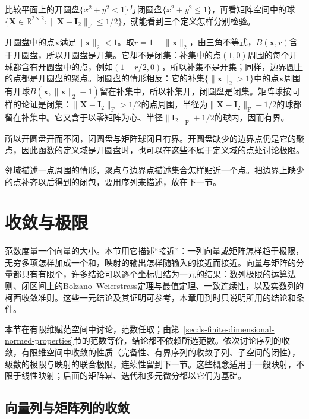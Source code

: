 \begin{example}[圆盘与矩阵球]
\label{ex:multivariable-open-closed-sets}
比较平面上的开圆盘$\{x^2+y^2<1\}$与闭圆盘$\{x^2+y^2\leq1\}$，再看矩阵空间中的球$\{\bm X\in\mathbb R^{2\times2}:\lVert\bm X-\bm I_2\rVert_{\mathrm F}\leq1/2\}$，就能看到三个定义怎样分别检验。

开圆盘中的点$\bm x$满足$\lVert\bm x\rVert_2<1$。取$r=1-\lVert\bm x\rVert_2$，由三角不等式，$B(\bm x,r)$含于开圆盘，所以开圆盘是开集。它却不是闭集：补集中的点$(1,0)$周围的每个开球都含有开圆盘中的点，例如$(1-r/2,0)$，所以补集不是开集；同样，边界圆上的点都是开圆盘的聚点。闭圆盘的情形相反：它的补集$\{\lVert\bm x\rVert_2>1\}$中的点$\bm x$周围有开球$B(\bm x,\lVert\bm x\rVert_2-1)$留在补集中，所以补集开，闭圆盘是闭集。矩阵球按同样的论证是闭集：$\lVert\bm X-\bm I_2\rVert_{\mathrm F}>1/2$的点周围，半径为$\lVert\bm X-\bm I_2\rVert_{\mathrm F}-1/2$的球都留在补集中。它又含于以零矩阵为心、半径$\lVert\bm I_2\rVert_{\mathrm F}+1/2$的球内，因而有界。

所以开圆盘开而不闭，闭圆盘与矩阵球闭且有界。开圆盘缺少的边界点仍是它的聚点，因此函数的定义域是开圆盘时，也可以在这些不属于定义域的点处讨论极限。
\end{example}

邻域描述一点周围的情形，聚点与边界点描述集合怎样贴近一个点。把边界上缺少的点补齐以后得到的闭包，要用序列来描述，放在下一节。

\section{收敛与极限}
\label{sec:multivariable-limits-continuity}

范数度量一个向量的大小。本节用它描述“接近”：一列向量或矩阵怎样趋于极限，无穷多项怎样加成一个和，映射的输出怎样随输入的接近而接近。向量与矩阵的分量都只有有限个，许多结论可以逐个坐标归结为一元的结果：数列极限的运算法则、闭区间上的Bolzano--Weierstrass定理与最值定理、一致连续性，以及实数列的柯西收敛准则。这些一元结论及其证明可参考，本章用到时只说明所用的结论和条件。

本节在有限维赋范空间中讨论，范数任取；由第~\ref{sec:ls-finite-dimensional-normed-properties}节的范数等价，结论都不依赖所选范数。依次讨论序列的收敛，有限维空间中收敛的性质（完备性、有界序列的收敛子列、子空间的闭性），级数的极限与映射的联合极限，连续性留到下一节。这些概念适用于一般映射，不限于线性映射；后面的矩阵幂、迭代和多元微分都以它们为基础。

\subsection{向量列与矩阵列的收敛}
\label{sec:ls-finite-dimensional-sequences}


